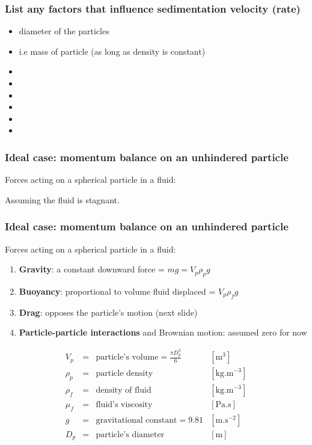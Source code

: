 \begin{frame}\frametitle{List any factors that influence sedimentation velocity (rate)}
	\begin{itemize}
		\item	diameter of the particles
		\item	i.e mass of particle (as long as density is constant)
		\pause
		\item	\iftoggle{instructor}{strength of gravitational field}{}
		\item	\iftoggle{instructor}{relative density of particle vs fluid}{}
		\item	\iftoggle{instructor}{density of fluid}{}
		\item	\iftoggle{instructor}{viscosity of fluid}{}
		\item	\iftoggle{instructor}{particle concentration (hindered)}{}
		\item	\iftoggle{instructor}{{\color{myRed}{no effect}}: \textbf{diameter of the vessel} (or area)... to a point}{}
	\end{itemize}
\end{frame}

\begin{frame}\frametitle{Ideal case: momentum balance on an unhindered particle}
	Forces acting on a spherical particle in a fluid:

	\vspace{7.5cm}
	Assuming the fluid is stagnant.
\end{frame}

\begin{frame}\frametitle{Ideal case: momentum balance on an unhindered particle}
	Forces acting on a spherical particle in a fluid:
	\begin{enumerate}
		\item	\textbf{Gravity}: a constant downward force = $mg = V_p \rho_p g$
		\item	\textbf{Buoyancy}: proportional to volume fluid displaced = $V_p \rho_f g$
		\item	\textbf{Drag}: opposes the particle's motion (next slide)
		\item	\textbf{Particle-particle interactions} and Brownian motion: assumed zero for now
	\end{enumerate}
	\[
		\begin{array}{rcll}
			V_p		&=& \text{particle's volume} = \displaystyle \frac{\pi D_p^3}{6} &[\text{m}^3]\\
			\rho_p 	&=& \text{particle density} &[\text{kg.m}^{-3}]\\
			\rho_f  &=& \text{density of fluid} &[\text{kg.m}^{-3}]\\
			\mu_f   &=& \text{fluid's viscosity} &[\text{Pa.s}]\\
			g		&=& \text{gravitational constant} = 9.81 &[\text{m.s}^{-2}] \\
			D_p 	&=& \text{particle's diameter} &[\text{m}]
		\end{array}
	\]
\end{frame}


